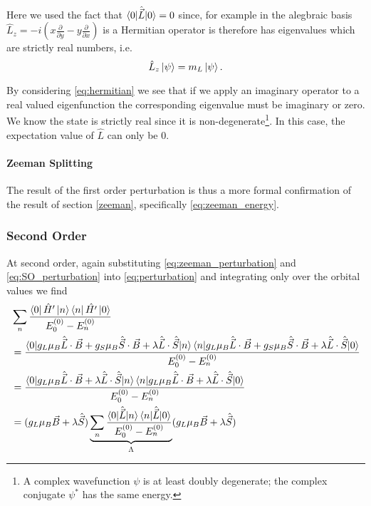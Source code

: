 Here we used the fact that $\braket{0 | \hat{\vec{L}} | 0} = 0$ since, for example in the alegbraic basis $\hat{L}_z = -i\left(x \frac{\partial}{\partial y} - y \frac{\partial }{\partial x}\right)$ is a Hermitian operator is therefore has eigenvalues which are strictly real numbers, i.e. 
\begin{equation}
    \hat{L}_z \ket{\psi} = m_L \ket{\psi}.
    \label{eq:hermitian}
\end{equation}

By considering \ref{eq:hermitian} we see that if we apply an imaginary operator to a real valued eigenfunction the corresponding eigenvalue must be imaginary or zero. We know the state is strictly real since it is non-degenerate\footnote{A complex wavefunction $\psi$ is at least doubly degenerate; the complex conjugate $\psi^*$ has the same energy.}. In this case, the expectation value of $\hat{L}$ can only be $0$. 

\paragraph{Zeeman Splitting}
The result of the first order perturbation is thus a more formal confirmation of the result of section \ref{zeeman}, specifically \ref{eq:zeeman_energy}.  

%
\subsubsection{Second Order}
At second order, again substituting \ref{eq:zeeman_perturbation} and \ref{eq:SO_perturbation} into \ref{eq:perturbation} and integrating only over the orbital values we find 
\begin{equation}
   \begin{align}
       &\sum_{n}\frac{\bra{0} \hat{H}' \ket{n} \bra{n} \hat{H'}\ket{0}}{E_0^{(0)} - E_n^{(0)}}\\ 
 &=\frac{\braket{0 |g_L \mu_B \hat{\vec{L}}\cdot\vec{B} + g_S \mu_B \hat{\vec{S}}\cdot\vec{B} +\lambda\hat{\vec{L}}\cdot \hat{\vec{S}}  | n } \braket{n |g_L \mu_B \hat{\vec{L}}\cdot\vec{B} + g_S \mu_B \hat{\vec{S}}\cdot\vec{B}+\lambda\hat{\vec{L}}\cdot \hat{\vec{S}}| 0}}{E_0^{(0)} - E_n^{(0)}}\\ 
 &=\frac{\braket{0 |g_L \mu_B \hat{\vec{L}}\cdot\vec{B} + \lambda\hat{\vec{L}}\cdot \hat{\vec{S}}  | n } \braket{n |g_L \mu_B \hat{\vec{L}}\cdot\vec{B} + \lambda\hat{\vec{L}}\cdot \hat{\vec{S}}| 0}}{E_0^{(0)} - E_n^{(0)}}\\ 
 &= (g_L \mu_B \vec{B} + \lambda \hat{\vec{S}})\underbrace{\sum_n \frac{\braket{0 |\hat{\vec{L}} | n}\braket{n |\hat{\vec{L}} | 0}}{E_0^{(0)} - E_n^{(0)}}}_{{\Lambda}}(g_L \mu_B \vec{B} + \lambda \hat{\vec{S}})
   \end{align}
\end{equation}

